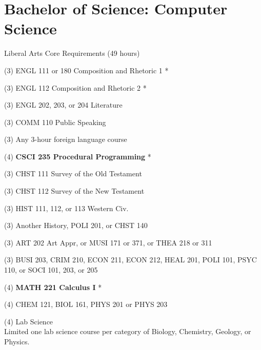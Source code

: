%
\section*{Bachelor of Science: Computer Science}

\begin{reqgroup}{Liberal Arts Core Requirements (49 hours)}
\begin{checklist}
\begin{minipage}[t]{0.5\linewidth}
	\item (3) ENGL 111 or 180 Composition and Rhetoric 1 *
	\item (3) ENGL 112 Composition and Rhetoric 2 *
	\item (3) ENGL 202, 203, or 204 Literature
	\item (3) COMM 110 Public Speaking
	\item (3) Any 3-hour foreign language course
	\item (4) \textbf{CSCI 235  Procedural Programming} *
	\item (3) CHST 111  Survey of the Old Testament
	\item (3) CHST 112  Survey of the New Testament
	\item (3) HIST 111, 112, or 113 Western Civ.
\end{minipage}
\begin{minipage}[t]{0.5\linewidth}
	\item (3)	Another History, POLI 201, or CHST 140
	\item (3)	ART 202 Art Appr, or MUSI 171 or 371, or THEA 218 or 311
	\item (3)	BUSI 203, CRIM 210, ECON 211, ECON 212, HEAL 201, POLI 101, PSYC 110, or SOCI 101, 203, or 205
	\item (4)	\textbf{MATH 221 Calculus I} *
	\item (4)	CHEM 121, BIOL 161, PHYS 201 or PHYS 203
	\item (4)	Lab Science\\Limited one lab science course per category of Biology, Chemistry,
Geology, or Physics.
\end{minipage}
\end{checklist}
\end{reqgroup}


